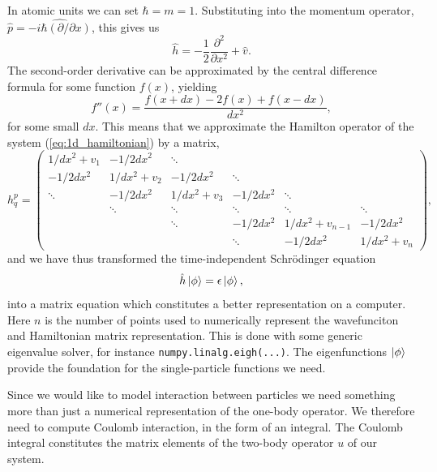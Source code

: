 In atomic units we can set $\hbar = m = 1$. Substituting into the 
momentum operator, $\hat{p} = \hat{-i\hbar (\partial / \partial x)}$, this gives us 
\begin{equation}
    \label{eq:1d_hamiltonian}
    \hat{h} = - \frac{1}{2} \frac{\partial^2}{\partial x^2} + \hat{v}.
\end{equation}
The second-order derivative can be approximated by the central difference 
formula for some function $f(x)$, yielding
\begin{equation}
    f''(x) = \frac{f(x + dx) - 2f(x) +f(x - dx)}{dx^2},
\end{equation}
for some small $dx$. This means that we approximate the Hamilton 
operator of the system (\autoref{eq:1d_hamiltonian}) by a matrix,
\begin{equation}
    h^p_q =  \begin{pmatrix}
    1/dx^2 + v_1 & -1/2dx^2 & \ddots & & & \\
    -1/2dx^2 & 1/dx^2 + v_2 & -1/2dx^2 & \ddots & & \\
    \ddots & -1/2dx^2 & 1/dx^2 + v_3 & -1/2dx^2 & \ddots & \\
    & \ddots & \ddots & \ddots & \ddots & \ddots \\
    & & \ddots & -1/2dx^2 & 1/dx^2 + v_{n-1} & -1/2dx^2 \\
    & & & \ddots & -1/2dx^2 & 1/dx^2 + v_n
    \end{pmatrix},
\end{equation}
and we have thus transformed the time-independent Schrödinger equation
\begin{equation}
    \hat{h} \ket{\phi} = \epsilon \ket{\phi},
\end{equation}
into a matrix equation which constitutes a better representation on 
a computer. Here $n$ is 
the number of points used to numerically represent the wavefunciton 
and Hamiltonian matrix representation. This is done with some generic 
eigenvalue solver, for instance \lstinline{numpy.linalg.eigh(...)}.
The eigenfunctions $\ket{\phi}$ provide the foundation for the single-particle functions
we need.

Since we would like to model interaction between particles we need something more
than just a numerical representation of the one-body operator. We therefore need to 
compute Coulomb interaction, in the form of an integral. The  Coulomb integral 
constitutes the matrix elements of the two-body operator $u$ of our system.


